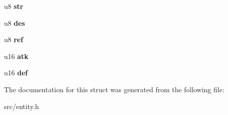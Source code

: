 \begin{DoxyCompactItemize}
u8 {\bfseries str}
\item 
\mbox{\label{structTEntity_ae98743585fd648c38adf15c26bd62911}} 
u8 {\bfseries des}
\item 
\mbox{\label{structTEntity_a8871569456da53c5ac3b8258d90baac6}} 
u8 {\bfseries ref}
\item 
\mbox{\label{structTEntity_a44008826cb8acb2c3a7457b3c4d19352}} 
u16 {\bfseries atk}
\item 
\mbox{\label{structTEntity_a9ea10dd32397c7a3afdae3cd3f7cbdfe}} 
u16 {\bfseries def}
\end{DoxyCompactItemize}


The documentation for this struct was generated from the following file\+:\begin{DoxyCompactItemize}
\item 
src/entity.\+h\end{DoxyCompactItemize}
